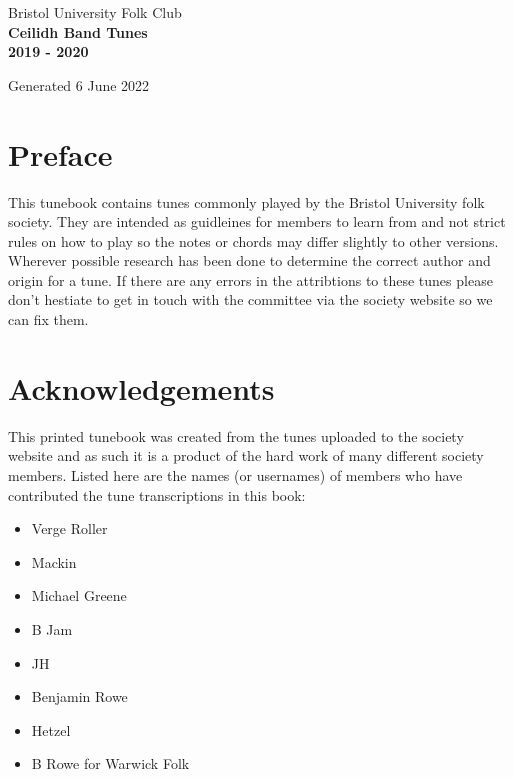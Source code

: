 \documentclass[12pt,a4paper,twoside]{article}
\makeatletter
\newcommand{\thetitle}{Ceilidh Band Tunes \\ \vspace{0.65cm} 2019 - 2020}
\newcommand{\thedate}{6 June 2022}
\renewcommand\tableofcontents{%
    \begin{multicols}{2}[
      \centering
      \section*{\large\contentsname
        \@mkboth{%
           \MakeUppercase\contentsname}{\MakeUppercase\contentsname}}]
    \@starttoc{toc}%
    \end{multicols}
}
\makeatother
\begin{document}
\begin{titlepage}
   \begin{center}
       \large Bristol University Folk Club \\

       \vspace{4cm}
       \textbf{\Huge \thetitle}

       \vspace{0.5cm}
       Generated \thedate

       \vspace{1.5cm}

       \vfill

   \end{center}
\end{titlepage}

\tableofcontents

\section{Preface}

This tunebook contains tunes commonly played by the Bristol University folk society. They are intended as guidleines for members to learn from and not strict rules on how to play so the notes or chords may differ slightly to other versions.
Wherever possible research has been done to determine the correct author and origin for a tune. If there are any errors in the attribtions to these tunes please don't hestiate to get in touch with the committee via the society website so we can fix them.

\section{Acknowledgements}

This printed tunebook was created from the tunes uploaded to the society website and as such it is a product of the hard work of many different society members. Listed here are the names (or usernames) of members who have contributed the tune transcriptions in this book:

\begin{multicols}{2}
\begin{itemize}\item Verge Roller
\item Mackin
\item Michael Greene
\item B Jam
\item JH
\item Benjamin Rowe
\item Hetzel
\item B Rowe for Warwick Folk
\end{itemize}

\end{multicols}
\end{document}
